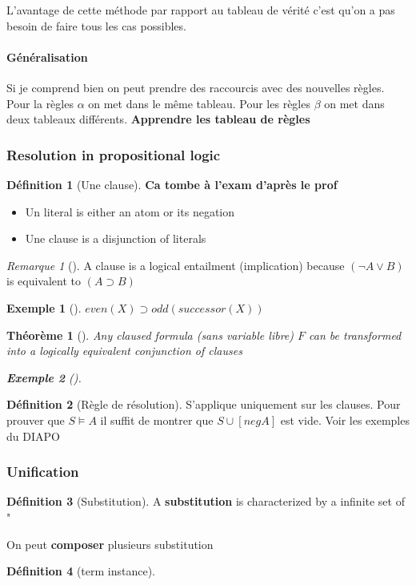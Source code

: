 \documentclass{article}
\theoremstyle{plain}%
\newtheorem{thm}{Théorème}[section]
\theoremstyle{definition}
\newtheorem{defn}{Définition}[section]
\newtheorem{exmp}{Exemple}[section]
\theoremstyle{remark}
\newtheorem*{rem}{Remarque}
\begin{document}
L'avantage de cette méthode par rapport au tableau de vérité c'est qu'on a pas besoin de faire tous les cas possibles.

\paragraph*{Généralisation} Si je comprend bien on peut prendre des raccourcis avec des nouvelles règles. Pour la règles $ \alpha  $ on met dans le même tableau. Pour les règles $ \beta  $ on met dans deux tableaux différents. \textbf{Apprendre les tableau de règles}

\subsubsection{Resolution in propositional logic}
\begin{defn}[Une clause]
    \textbf{Ca tombe à l'exam d'après le prof}
    \begin{itemize}
        \item Un literal is either an atom or its negation
        \item Une clause is a disjunction of literals
    \end{itemize}
    \begin{rem}[]
        A clause is a logical entailment (implication) because $ (\neg A \vee B) $ is equivalent to $ (A \supset B) $ 
    \end{rem}
    \begin{exmp}[]
        $ even(X) \supset odd(successor(X)) $ 
    \end{exmp}
\end{defn}
\begin{thm}[]
    Any claused formula (sans variable libre) $ F $ can be transformed into a logically equivalent conjunction of clauses
    \begin{exmp}[]
        
    \end{exmp}
\end{thm}

\begin{defn}[Règle de résolution]
    S'applique uniquement sur les clauses.
    Pour prouver que $ S \models A $ il suffit de montrer que $ S \cup [neg A] $ est vide. Voir les exemples du DIAPO
\end{defn}

\subsubsection{Unification}
\begin{defn}[Substitution]
    A \textbf{substitution} is characterized by a infinite set of "

    On peut \textbf{composer} plusieurs substitution
\end{defn}
\begin{defn}[term instance]

\end{defn}
\end{document}
